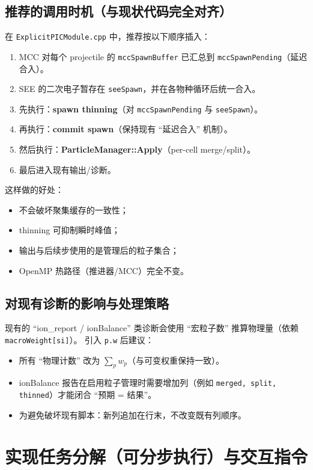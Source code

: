 \documentclass[UTF8,11pt,a4paper]{ctexart}
\begin{document}
\subsection{推荐的调用时机（与现状代码完全对齐）}
在 \texttt{ExplicitPICModule.cpp} 中，推荐按以下顺序插入：
\begin{enumerate}[itemsep=2pt]
  \item MCC 对每个 projectile 的 \texttt{mccSpawnBuffer} 已汇总到 \texttt{mccSpawnPending}（延迟合入）。
  \item SEE 的二次电子暂存在 \texttt{seeSpawn}，并在各物种循环后统一合入。
  \item 先执行：\textbf{spawn thinning}（对 \texttt{mccSpawnPending} 与 \texttt{seeSpawn}）。
  \item 再执行：\textbf{commit spawn}（保持现有 ``延迟合入'' 机制）。
  \item 然后执行：\textbf{ParticleManager::Apply}（per-cell merge/split）。
  \item 最后进入现有输出/诊断。
\end{enumerate}
这样做的好处：
\begin{itemize}[itemsep=2pt]
  \item 不会破坏聚集缓存的一致性；
  \item thinning 可抑制瞬时峰值；
  \item 输出与后续步使用的是管理后的粒子集合；
  \item OpenMP 热路径（推进器/MCC）完全不变。
\end{itemize}

\subsection{对现有诊断的影响与处理策略}
现有的 ``ion\_report / ionBalance'' 类诊断会使用 ``宏粒子数'' 推算物理量（依赖 \texttt{macroWeight[si]}）。
引入 \texttt{p.w} 后建议：
\begin{itemize}[itemsep=2pt]
  \item 所有 ``物理计数'' 改为 $\sum_p w_p$（与可变权重保持一致）。
  \item ionBalance 报告在启用粒子管理时需要增加列（例如 \texttt{merged, split, thinned}）才能闭合 ``预期 = 结果''。
  \item 为避免破坏现有脚本：新列追加在行末，不改变既有列顺序。
\end{itemize}

\section{实现任务分解（可分步执行）与交互指令}
\end{document}
